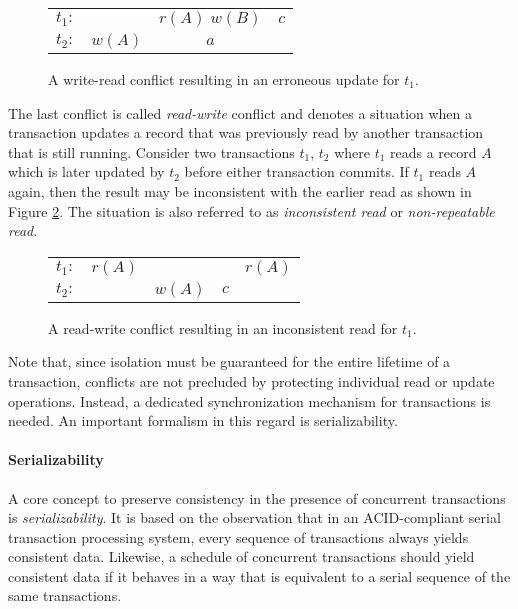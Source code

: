 \begin{figure}[h!]
    \centering
    \begin{tabular}{r c c c}
        $t_1:$ &        & $r(A)\; w(B)$ & $c$ \\
        $t_2:$ & $w(A)$ & $a$           & \\
    \end{tabular}
    \caption{A write-read conflict resulting in an erroneous update for $t_1$.}
    \label{fig:wr-conflict}
\end{figure}

The last conflict is called \emph{read-write} conflict and denotes a situation
when a transaction updates a record that was previously read by another
transaction that is still running. Consider two transactions $t_1$, $t_2$ where
$t_1$ reads a record $A$ which is later updated by $t_2$ before either
transaction commits. If $t_1$ reads $A$ again, then the result may be
inconsistent with the earlier read as shown in Figure \ref{fig:rw-conflict}. The
situation is also referred to as \emph{inconsistent read} or
\emph{non-repeatable read}.

\begin{figure}[h!]
    \centering
    \begin{tabular}{r c c c c}
        $t_1:$ & $r(A)$ &        &     & $r(A)$ \\
        $t_2:$ &        & $w(A)$ & $c$ & \\
    \end{tabular}
    \caption{A read-write conflict resulting in an inconsistent read for $t_1$.}
    \label{fig:rw-conflict}
\end{figure}

Note that, since isolation must be guaranteed for the entire lifetime of a
transaction, conflicts are not precluded by protecting individual read or update
operations. Instead, a dedicated synchronization mechanism for transactions is
needed. An important formalism in this regard is serializability.

\paragraph{Serializability}

A core concept to preserve consistency in the presence of concurrent
transactions is \emph{serializability}. It is based on the observation that in
an ACID-compliant serial transaction processing system, every sequence of
transactions always yields consistent data. Likewise, a schedule of concurrent
transactions should yield consistent data if it behaves in a way that is
equivalent to a serial sequence of the same transactions.

